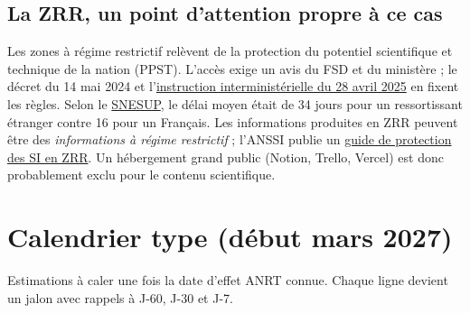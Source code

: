 \documentclass[11pt,a4paper]{article}
\begin{document}
\subsection*{La ZRR, un point d'attention propre à ce cas}
Les zones à régime restrictif relèvent de la protection du potentiel scientifique et
technique de la nation (PPST). L'accès exige un avis du FSD et du ministère ; le décret
du 14 mai 2024 et
l'\href{https://armement.defense.gouv.fr/sites/default/files/2025-05/Instruction\%20interminist\%C3\%A9rielle_20250428_PPST.pdf}{instruction interministérielle du 28 avril 2025}
en fixent les règles. Selon le
\href{https://www.snesup.fr/sites/default/files/2025-11/recherche_snesup-ndeg-738pp22-23.pdf}{SNESUP},
le délai moyen était de 34 jours pour un ressortissant étranger contre 16 pour un
Français. Les informations produites en ZRR peuvent être des \emph{informations à
régime restrictif} ; l'ANSSI publie un
\href{https://armement.defense.gouv.fr/sites/default/files/2022-02/guide_ANSSI_protection_numerique_PSTN_juin_2018.pdf}{guide de protection des SI en ZRR}.
Un hébergement grand public (Notion, Trello, Vercel) est donc probablement exclu pour
le contenu scientifique.

\section{Calendrier type (début mars 2027)}

Estimations à caler une fois la date d'effet ANRT connue. Chaque ligne devient un
jalon avec rappels à J-60, J-30 et J-7.
\end{document}
